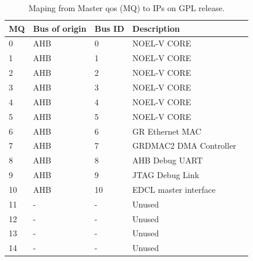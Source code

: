\begin{table}[H]
	\caption{Maping from Master qos (MQ) to IPs on GPL release. }
	\label{table:t_ev2}
	\centering
		\begin{tabular}{|l|l|l|l|l|}
			\hline
			\textbf{MQ} & \textbf{Bus of origin}  & \textbf{Bus ID} & \textbf{Description}\\
			\hline
0 & AHB & 0 &  NOEL-V CORE \\
1 & AHB & 1 &  NOEL-V CORE \\
2 & AHB & 2 &  NOEL-V CORE \\
3 & AHB & 3 &  NOEL-V CORE \\
4 & AHB & 4 &  NOEL-V CORE \\
5 & AHB & 5 &  NOEL-V CORE \\
6 & AHB & 6 &  GR Ethernet MAC \\
7 & AHB & 7 &  GRDMAC2 DMA Controller \\
8 & AHB & 8 &  AHB Debug UART \\
9 & AHB & 9 &  JTAG Debug Link \\
10 & AHB & 10 &  EDCL master interface   \\
11 & - & - & Unused \\
12 & - & - & Unused  \\
13 & - & - & Unused   \\
14 & - & - & Unused  \\
	\hline
		\end{tabular}
\end{table}


